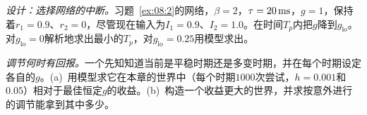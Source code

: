\begin{exercise}[\lvlB]
\label{ex:08:6}
\emph{设计：选择网络的中断。}习题~\ref{ex:08:2}的网络，$\beta=2$，$\tau=20\,\text{ms}$，$g=1$，保持着$r_1=0.9$、$r_2=0$，尽管现在输入为$I_1=0.9$、$I_2=1.0$。在时间$T_p$内把$g$降到$g_{\text{lo}}$。对$g_{\text{lo}}=0$解析地求出最小的$T_p$，对$g_{\text{lo}}=0.25$用模型求出。
\end{exercise}

\begin{exercise}[\lvlC]
\label{ex:08:7}
\emph{调节何时有回报。}一个先知知道当前是平稳时期还是多变时期，并在每个时期设定各自的$g$。(a)~用模型求它在本章的世界中（每个时期$1000$次尝试，$h=0.001$和$0.05$）相对于最佳恒定$g$的收益。(b)~构造一个收益更大的世界，并求按意外进行的调节能拿到其中多少。
\end{exercise}
